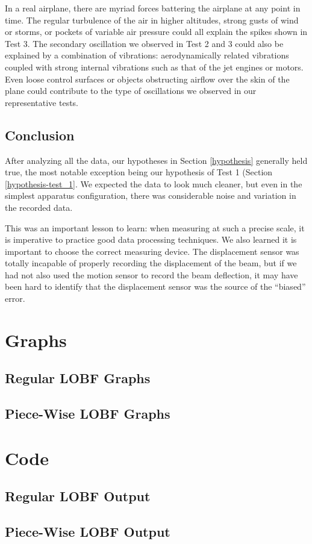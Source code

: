 \documentclass[12 pt]{report}
\begin{document}
In a real airplane, there are myriad forces battering the airplane at any point in time. The regular turbulence of the air in higher altitudes, strong gusts of wind or storms, or pockets of variable air pressure could all explain the spikes shown in Test \num{3}. The secondary oscillation we observed in Test \num{2} and \num{3} could also be explained by a combination of vibrations: aerodynamically related vibrations coupled with strong internal vibrations such as that of the jet engines or motors. Even loose control surfaces or objects obstructing airflow over the skin of the plane could contribute to the type of oscillations we observed in our representative tests.

\section{Conclusion} \label{conclusion-section}
After analyzing all the data, our hypotheses in Section \ref{hypothesis} generally held true, the most notable exception being our hypothesis of Test \num{1} (Section \ref{hypothesis-test_1}. We expected the data to look much cleaner, but even in the simplest apparatus configuration, there was considerable noise and variation in the recorded data.

This was an important lesson to learn: when measuring at such a precise scale, it is imperative to practice good data processing techniques. We also learned it is important to choose the correct measuring device. The displacement sensor was totally incapable of properly recording the displacement of the beam, but if we had not also used the motion sensor to record the beam deflection, it may have been hard to identify that the displacement sensor was the source of the ``biased'' error.

\printbibliography[heading=subbibintoc]

\appendix
\chapter{Graphs} \label{graphs}
\section{Regular LOBF Graphs} \label{regular_lobf_graphs}


\section{Piece-Wise LOBF Graphs} \label{piece-wise_lobf_graphs}


\chapter{Code} \label{code}


\section{Regular LOBF Output} \label{regular_lobf_output}


\section{Piece-Wise LOBF Output} \label{piece-wise_lobf_output}
\end{document}
